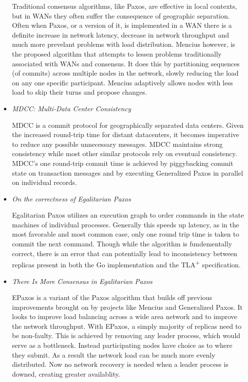 \documentclass{article}
\begin{document}
\begin{itemize}
	Traditional consensus algorithms, like Paxos, are effective in local contexts, but in WANs they often suffer the consequence of geographic separation.
	Often when Paxos, or a version of it, is implemented in a WAN there is a definite increase in network latency, decrease in network throughput and much more prevelant problems with load distribution.
	Mencius however, is the proposed algorithm that attempts to lessen problems traditionally associated with WANs and consensus.
	It does this by partitioning sequences (of commits) across multiple nodes in the network, slowly reducing the load on any one specific participant. Mencius adaptively allows nodes with less load to skip their turns and propose changes.

	\item
	\textit{MDCC: Multi-Data Center Consistency} \cite{MDCC}

	MDCC is a commit protocol for geographically separated data centers.
	Given the increased round-trip time for distant datacenters, it becomes imperative to reduce any possible unnecessary messages. MDCC maintains strong consistency while most other similar protocols rely on eventual consistency.
	MDCC's one round-trip commit time is achieved by piggybacking commit state on transaction messages
	and by executing Generalized Paxos in parallel on individual records.
	

	\item
	\textit{On the correctness of Egalitarian Paxos} \cite{SutraEPaxos}

	Egalitarian Paxos utilizes an execution graph to order commands in the state machines of individual processes.
	Generally this speeds up latency, as in the most favorable and most common case, only one round trip time is taken to commit the next command.
	Though while the algorithm is fundementally correct, there is an error that can potentially lead to inconsistency between replicas present in both the Go implementation and the TLA\textsuperscript{+} specification. 

	\item
	\textit{There Is More Consensus in Egalitarian Paxos} \cite{EPaxos}

	EPaxos is a variant of the Paxos algorithm that builds off previous improvements brought on by projects like Mencius and Generalized Paxos.
	It looks to improve load balancing across a wide area network and to improve the network throughput. With EPaxos, a simply majority of replicas need to be non-faulty.
	This is achieved by removing any leader process, which would serve as a bottleneck. Instead participating nodes have choice as to where they submit.
	As a result the network load can be much more evenly distributed. Now no network recovery is needed when a leader process is downed, creating greater availablity.


\end{itemize}
\end{document}
